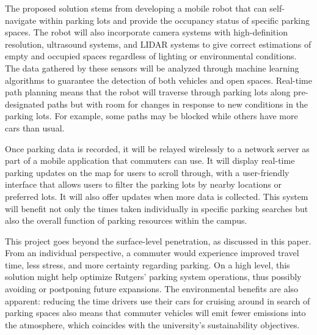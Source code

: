 \documentclass{article}
\begin{document}
\begin{enumerate}[leftmargin=1.5cm]
    The proposed solution stems from developing a mobile robot that can self-navigate within parking lots and provide the occupancy status of specific parking spaces. 
    The robot will also incorporate camera systems with high-definition resolution, 
    ultrasound systems, 
    and LIDAR systems to give correct estimations of empty and occupied spaces regardless of lighting or environmental conditions. 
    The data gathered by these sensors will be analyzed through machine learning algorithms to guarantee the detection of both vehicles and open spaces. 
    Real-time path planning means that the robot will traverse through parking lots along pre-designated paths but with room for changes in response to new conditions in the parking lots. 
    For example, some paths may be blocked while others have more cars than usual.

    Once parking data is recorded, 
    it will be relayed wirelessly to a network server as part of a mobile application that commuters can use. 
    It will display real-time parking updates on the map for users to scroll through, 
    with a user-friendly interface that allows users to filter the parking lots by nearby locations or preferred lots. 
    It will also offer updates when more data is collected. 
    This system will benefit not only the times taken individually in specific parking searches but also the overall function of parking resources within the campus.

    This project goes beyond the surface-level penetration, 
    as discussed in this paper. 
    From an individual perspective, 
    a commuter would experience improved travel time, 
    less stress, 
    and more certainty regarding parking. 
    On a high level, 
    this solution might help optimize Rutgers’ parking system operations, 
    thus possibly avoiding or postponing future expansions. 
    The environmental benefits are also apparent: 
    reducing the time drivers use their cars for cruising around in search of parking spaces also means that commuter vehicles will emit fewer emissions into the atmosphere, 
    which coincides with the university’s sustainability objectives.

\end{enumerate}
\end{document}
